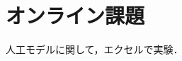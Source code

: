 \documentclass[dvipdfmx,a4,11pt]{jsarticle}
\theoremstyle{definition}
\numberwithin{equation}{section}
\begin{document}
\clearpage



\clearpage
\section{オンライン課題} %
人工モデルに関して，エクセルで実験．


\clearpage



\clearpage



\clearpage



\clearpage



\clearpage



\clearpage


\clearpage


\clearpage


\clearpage


\clearpage


\clearpage



\clearpage

\end{document}
